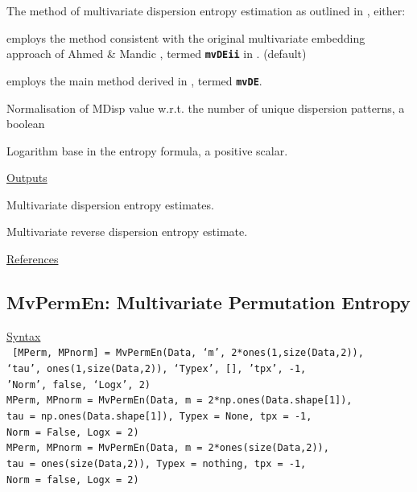 \documentclass[12pt, a4paper, titlepage, openany]{book}
\begin{document}
\begin{description}[labelsep=1cm, labelwidth=2cm, nosep,,style=multiline,leftmargin=3cm]
\begin{description}[labelsep=5em, labelwidth=8em, nosep,style=multiline,leftmargin=3cm]
	\end{description}
\item[\texttt{Methodx}]		The method of multivariate dispersion entropy estimation as outlined in \cite{MvDispEn1}, either: 
	\begin{description}[labelsep=5em, labelwidth=8em, nosep,style=multiline,leftmargin=3cm]
\item[\texttt{"v1"}]    employs the method consistent with the original multivariate embedding approach of Ahmed \& Mandic \cite{MvDispEn2}, termed \textbf{\texttt{mvDEii}} in \cite{MvDispEn1}. (default) 
\item[\texttt{"v2"}]    employs the main method derived in \cite{MvDispEn1}, termed \textbf{\texttt{mvDE}}.
	\end{description}
\item[\texttt{Norm}]	Normalisation of MDisp value w.r.t. the number of unique dispersion patterns, a boolean
\item[\texttt{Logx}]	Logarithm base in the entropy formula, a positive scalar.
\end{description}

\noindent \ul{Outputs}
\begin{description}[labelsep=1cm, labelwidth=2cm, nosep, style=multiline,leftmargin=3cm]\footnotesize
\item[\texttt{MDisp}]		Multivariate dispersion entropy estimates.
\item[\texttt{RDE}]		Multivariate reverse dispersion entropy estimate.
\end{description} 

\noindent \ul{References}\hspace{1cm}
\cite{MvDisp1}




\newpage
\subsection{\normalsize MvPermEn: \hspace{15mm} Multivariate Permutation Entropy} \label{MvPermEn}
\noindent\ul{Syntax} \vspace{6mm} \\ \noindent \texttt{\footnotesize
[MPerm, MPnorm] = MvPermEn(Data, ‘m’, 2*ones(1,size(Data,2)),  \\ \indent ‘tau’, ones(1,size(Data,2)), ‘Typex’, [], 'tpx', -1,\\ \indent 'Norm', false, ‘Logx’, 2)\\
 MPerm, MPnorm  = MvPermEn(Data, m = 2*np.ones(Data.shape[1]),  \\ \indent tau = np.ones(Data.shape[1]), Typex = None, tpx = -1, \\ \indent Norm = False, Logx = 2)\\
 MPerm, MPnorm  = MvPermEn(Data, m = 2*ones(size(Data,2)), \\ \indent tau = ones(size(Data,2)), Typex = nothing, tpx = -1, \\ \indent Norm = false, Logx = 2)} 
 
\end{document}
